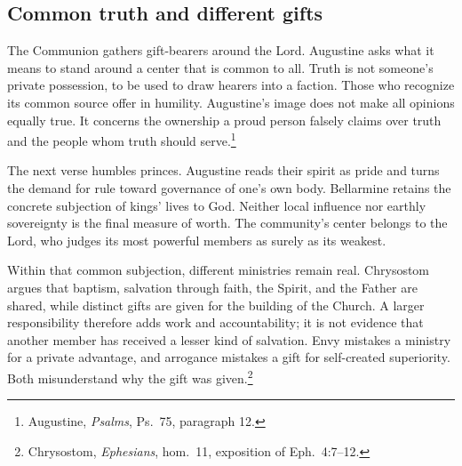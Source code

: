 \subsection{Common truth and different gifts}
The Communion gathers gift-bearers around the Lord. Augustine asks what it means to stand around a center that is common to all. Truth is not someone's private possession, to be used to draw hearers into a faction. Those who recognize its common source offer in humility. Augustine's image does not make all opinions equally true. It concerns the ownership a proud person falsely claims over truth and the people whom truth should serve.\footnote{Augustine, \textit{Psalms}, Ps.~75, paragraph 12.}

The next verse humbles princes. Augustine reads their spirit as pride and turns the demand for rule toward governance of one's own body. Bellarmine retains the concrete subjection of kings' lives to God. Neither local influence nor earthly sovereignty is the final measure of worth. The community's center belongs to the Lord, who judges its most powerful members as surely as its weakest.

Within that common subjection, different ministries remain real. Chrysostom argues that baptism, salvation through faith, the Spirit, and the Father are shared, while distinct gifts are given for the building of the Church. A larger responsibility therefore adds work and accountability; it is not evidence that another member has received a lesser kind of salvation. Envy mistakes a ministry for a private advantage, and arrogance mistakes a gift for self-created superiority. Both misunderstand why the gift was given.\footnote{Chrysostom, \textit{Ephesians}, hom.~11, exposition of Eph.~4:7--12.}

